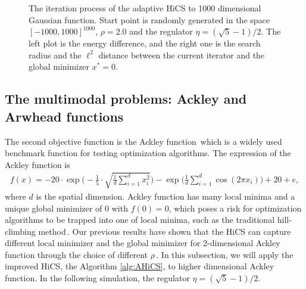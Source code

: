 \documentclass[mathpazo]{csam}
\theoremstyle{remark}
\begin{document}
\begin{figure}[!htbp]
\begin{minipage}[b]{0.5\linewidth}
{	  }
	\end{minipage}
	  \caption{The iteration process of the adaptive HiCS to 1000
	  dimensional Gaussian function. 
	  Start point is randomly generated in the space $[-1000,
	  1000]^{1000}$, $\rho=2.0$ and the regulator
	  $\eta=(\sqrt{5}-1)/2$. The left plot is the energy
	  difference, and the right one is the search radius and 
	  the $\ell^2$ distance between the current iterator and the
	  global minimizer $x^*=0$.
	  } 
	  \label{fig:gauss:1000D}
\end{figure}

\subsection{The multimodal problems: Ackley and Arwhead functions}
\label{subsec:minmulit}

The second objective function is the Ackley
function\,\cite{stacey2003particle, dieterich2012empirical} which is a widely used 
benchmark function for testing optimization algorithms.
The expression of the Ackley function is
\begin{align}
	f(x) =
	-20\cdot\exp\Bigg(-\frac{1}{5}\cdot\sqrt{\frac{1}{d}\sum_{i=1}^d
	x_i^2}\Bigg)-
	\exp\Bigg(\frac{1}{d}\sum_{i=1}^d \cos(2\pi x_i)\Bigg)+20+e,
	\label{eqn:ackley}
\end{align}
where $d$ is the spatial dimension.
Ackley function has many local minima and a unique global
minimizer of $0$ with $f(0)=0$, which poses a risk for
optimization algorithms to be trapped into one of local
minima, such as the traditional hill-climbing method\,\cite{back1996evolutionary}.
Our previous results have shown that the HiCS can capture
different local minimizer and the global minimizer for 2-dimensional Ackley
function through the choice of different $\rho$\,\cite{huang2017hill}.
In this subsection, we will apply the improved HiCS, the Algorithm \ref{alg:AHiCS},
to higher dimensional Ackley function. 
In the following simulation, the regulator
$\eta=(\sqrt{5}-1)/2$.
\end{document}
